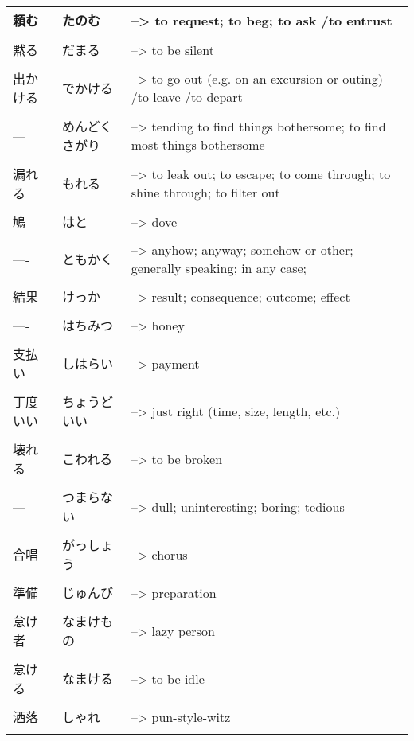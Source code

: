 \documentclass{article}
\begin{document}
\begin{tabular}{ l | l p{14cm}  }
頼む & たのむ &--> to request; to beg; to ask /to entrust \\ \hline\\[-1em]
黙る & だまる &--> to be silent \\ \hline\\[-1em]
出かける & でかける &--> to go out (e.g. on an excursion or outing) /to leave /to depart \\ \hline\\[-1em]
---- & めんどくさがり &--> tending to find things bothersome; to find most things bothersome \\ \hline\\[-1em]
漏れる & もれる &--> to leak out; to escape; to come through; to shine through; to filter out \\ \hline\\[-1em]
鳩 & はと &--> dove \\ \hline\\[-1em]
---- & ともかく &--> anyhow; anyway; somehow or other; generally speaking; in any case; \\ \hline\\[-1em]
結果 & けっか &--> result; consequence; outcome; effect \\ \hline\\[-1em]
---- & はちみつ &--> honey \\ \hline\\[-1em]
支払い & しはらい &--> payment \\ \hline\\[-1em]
丁度いい & ちょうどいい  &--> just right (time, size, length, etc.) \\ \hline\\[-1em]
壊れる & こわれる &--> to be broken \\ \hline\\[-1em]
---- & つまらない &--> dull; uninteresting; boring; tedious \\ \hline\\[-1em]
合唱 & がっしょう &--> chorus \\ \hline\\[-1em]
準備 & じゅんび &--> preparation \\ \hline\\[-1em]
怠け者 & なまけもの &--> lazy person\\ \hline\\[-1em]
怠ける & なまける &--> to be idle \\ \hline\\[-1em]
洒落 & しゃれ &--> pun-style-witz\\ \hline\\[-1em]
\end{tabular} \\
\end{document}

